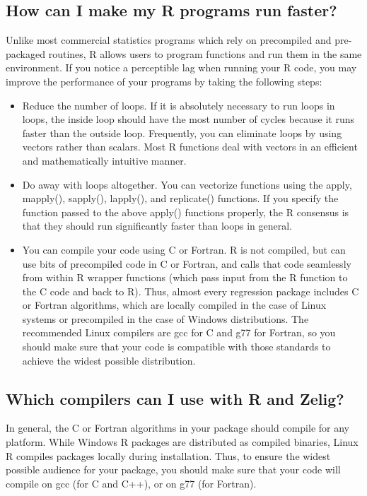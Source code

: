 \documentclass[letterpaper,10pt,english]{sphinxmanual}
\begin{document}
\subsection{How can I make my R programs run faster?}
\label{10_faq:how-can-i-make-my-r-programs-run-faster}
Unlike most commercial statistics programs which rely on precompiled and
pre-packaged routines, R allows users to program functions and run them
in the same environment. If you notice a perceptible lag when running
your R code, you may improve the performance of your programs by taking
the following steps:
\begin{itemize}
\item {} 
Reduce the number of loops. If it is absolutely necessary to run
loops in loops, the inside loop should have the most number of cycles
because it runs faster than the outside loop. Frequently, you can
eliminate loops by using vectors rather than scalars. Most R
functions deal with vectors in an efficient and mathematically
intuitive manner.

\item {} 
Do away with loops altogether. You can vectorize functions using the
apply, mapply(), sapply(), lapply(), and replicate() functions. If
you specify the function passed to the above apply() functions
properly, the R consensus is that they should run significantly
faster than loops in general.

\item {} 
You can compile your code using C or Fortran. R is not compiled, but
can use bits of precompiled code in C or Fortran, and calls that code
seamlessly from within R wrapper functions (which pass input from the
R function to the C code and back to R). Thus, almost every
regression package includes C or Fortran algorithms, which are
locally compiled in the case of Linux systems or precompiled in the
case of Windows distributions. The recommended Linux compilers are
gcc for C and g77 for Fortran, so you should make sure that your code
is compatible with those standards to achieve the widest possible
distribution.

\end{itemize}


\subsection{Which compilers can I use with R and Zelig?}
\label{10_faq:which-compilers-can-i-use-with-r-and-zelig}
In general, the C or Fortran algorithms in your package should compile
for any platform. While Windows R packages are distributed as compiled
binaries, Linux R compiles packages locally during installation. Thus,
to ensure the widest possible audience for your package, you should make
sure that your code will compile on gcc (for C and C++), or on g77 (for
Fortran).
\end{document}
